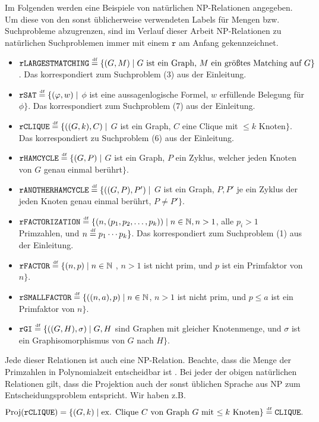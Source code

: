 Im Folgenden werden eine Beispiele von natürlichen NP-Relationen angegeben. Um diese von den sonst üblicherweise verwendeten Labels für Mengen bzw. Suchprobleme abzugrenzen, sind im Verlauf dieser Arbeit NP-Relationen zu natürlichen Suchproblemen immer mit einem $\mathtt{r}$ am Anfang gekennzeichnet.
\label{page:natural-searchproblems}
\begin{itemize}[midpenalty=0]
\item $\mathtt{rLARGESTMATCHING} \stackrel{\text{{\normalfont\tiny df}}}{=} \{ (G, M) \mid \text{$G$ ist ein Graph, $M$ ein größtes Matching auf $G$} \}$. Das korrespondiert zum Suchproblem (3) aus der Einleitung.
\item $\mathtt{rSAT} \stackrel{\text{{\normalfont\tiny df}}}{=} \{ (\varphi, w) \mid $ $\phi$ ist eine aussagenlogische Formel, $w$ erfüllende Belegung für $\phi$$\}$. Das korrespondiert zum Suchproblem (7) aus der Einleitung.
\item $\mathtt{rCLIQUE} \stackrel{\text{{\normalfont\tiny df}}}{=} \{ ((G, k), C) \mid $ $G$ ist ein Graph, $C$ eine Clique mit $\leq k$ Knoten$\}$. Das korrespondiert zu Suchproblem (6) aus der Einleitung.
\item $\mathtt{rHAMCYCLE} \stackrel{\text{{\normalfont\tiny df}}}{=} \{ (G, P) \mid $ $G$ ist ein Graph, $P$ ein Zyklus, welcher jeden Knoten von $G$ genau einmal berührt$\}$.
\item $\mathtt{rANOTHERHAMCYCLE} \stackrel{\text{{\normalfont\tiny df}}}{=} \{ ((G, P), P') \mid $ $G$ ist ein Graph, $P, P'$ je ein Zyklus der jeden Knoten genau einmal berührt, $P\neq P' \}$.
\item $\mathtt{rFACTORIZATION} \stackrel{\text{{\normalfont\tiny df}}}{=} \{ (n, (p_1,p_2,\dots, p_k)) \mid n\in\mathbb N, n>1$, alle $p_i>1$ Primzahlen, und $n\stackrel{\text{{\normalfont\tiny df}}}{=} p_1\cdots p_k \}$. Das korrespondiert zum Suchproblem (1) aus der Einleitung.
\item $\mathtt{rFACTOR} \stackrel{\text{{\normalfont\tiny df}}}{=} \{ (n, p) \mid n\in\mathbb N$ , $n>1$ ist nicht prim, und $p$ ist ein Primfaktor von $n\}$.
\item $\mathtt{rSMALLFACTOR} \stackrel{\text{{\normalfont\tiny df}}}{=} \{ ((n, a), p) \mid n\in\mathbb N$, $n>1$ ist nicht prim, und $p\leq a$ ist ein Primfaktor von $n$$\}$.
\item $\mathtt{rGI} \stackrel{\text{{\normalfont\tiny df}}}{=} \{ ((G, H), \sigma) \mid G, H$ sind Graphen mit gleicher Knotenmenge, und $\sigma$ ist ein Graphisomorphismus von $G$ nach $H\}$.
\end{itemize}
Jede dieser Relationen ist auch eine NP-Relation. Beachte, dass die Menge der Primzahlen in Polynomialzeit entscheidbar ist \parencite{agrawal_primes_2004}.
Bei jeder der obigen natürlichen Relationen gilt, dass die Projektion auch der sonst üblichen Sprache aus NP zum Entscheidungsproblem entspricht. Wir haben z.B.
\[ \operatorname{Proj}(\mathtt{rCLIQUE}) = \{ (G, k) \mid \text{ex. Clique $C$ von Graph $G$ mit $\leq k$ Knoten} \} \stackrel{\text{{\normalfont\tiny df}}}{=} \mathtt{CLIQUE}. \]

